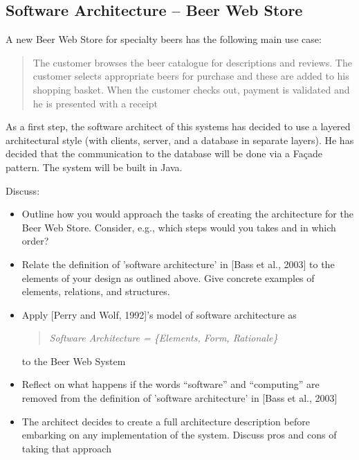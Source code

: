 \subsection{Software Architecture -- Beer Web Store}
A new Beer Web Store for specialty beers has the following main use
case:
\begin{quote}
  The customer browses the beer catalogue for descriptions and
  reviews. The customer selects appropriate beers for purchase and
  these are added to his shopping basket. When the customer checks
  out, payment is validated and he is presented with a receipt
\end{quote}
As a first step, the software architect of this systems has decided to
use a layered architectural style (with clients, server, and a
database in separate layers). He has decided that the communication to
the database will be done via a Fa\c cade pattern. The system will be
built in Java.

Discuss:
\begin{itemize}
    \item Outline how you would approach the tasks of creating the
    architecture for the Beer Web Store. Consider, e.g., which steps
    would you takes and in which order?
    \item Relate the definition of 'software architecture' in [Bass et
    al., 2003] to the elements of your design as outlined above. Give
    concrete examples of elements, relations, and structures.
    \item Apply [Perry and Wolf, 1992]'s model of software architecture as
      \begin{quote}
	{\it Software Architecture = \{Elements, Form, Rationale\}}
      \end{quote}
      to the Beer Web System
    \item Reflect on what happens if the words ``software'' and
    ``computing'' are removed from the definition of 'software
    architecture' in [Bass et al., 2003]
    \item The architect decides to create a full architecture
    description before embarking on any implementation of the
    system. Discuss pros and cons of taking that approach
\end{itemize}
